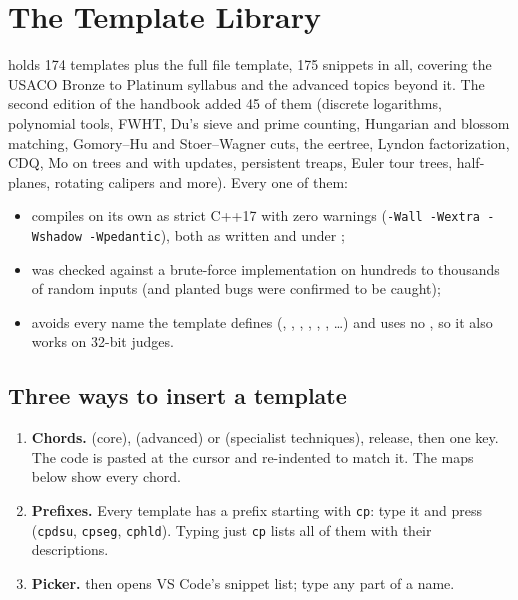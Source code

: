 \chapter{The Template Library}\label{ch:library}

 holds 174 templates plus the full file template, 175 snippets in all, covering the USACO Bronze
to Platinum syllabus and the advanced topics beyond it. The second edition of the handbook added 45 of them (discrete
logarithms, polynomial tools, FWHT, Du's sieve and prime counting, Hungarian and blossom matching, Gomory--Hu and
Stoer--Wagner cuts, the eertree, Lyndon factorization, CDQ, Mo on trees and with updates, persistent treaps, Euler tour
trees, half-planes, rotating calipers and more). Every one of them:

\begin{itemize}
  \item compiles on its own as strict C++17 with zero warnings (\texttt{-Wall -Wextra -Wshadow -Wpedantic}), both as
        written and under ;
  \item was checked against a brute-force implementation on hundreds to thousands of random inputs (and planted bugs
        were confirmed to be caught);
  \item avoids every name the template defines (, , , , , ,
        \ldots) and uses no , so it also works on 32-bit judges.
\end{itemize}

\section{Three ways to insert a template}

\begin{enumerate}
  \item \textbf{Chords.}  (core),  (advanced) or  (specialist
        techniques), release, then one key. The code is pasted at the cursor and re-indented to match it. The maps below
        show every chord.
  \item \textbf{Prefixes.} Every template has a prefix starting with \texttt{cp}: type it and press 
        (\texttt{cpdsu}, \texttt{cpseg}, \texttt{cphld}). Typing just \texttt{cp} lists all of them with their descriptions.
  \item \textbf{Picker.}  then  opens VS Code's snippet list; type any part of a name.
\end{enumerate}

